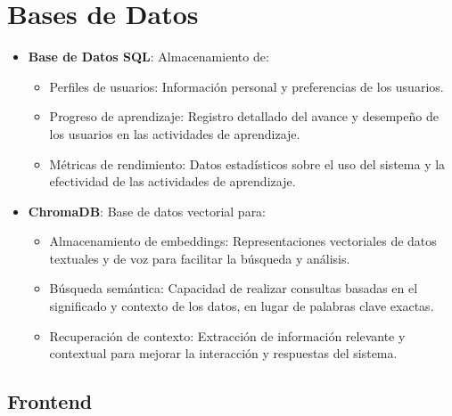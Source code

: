 \section{Bases de Datos}

\begin{itemize}
    \item \textbf{Base de Datos SQL}: Almacenamiento de:
    \begin{itemize}
        \item Perfiles de usuarios: Información personal y preferencias de los usuarios.
        \item Progreso de aprendizaje: Registro detallado del avance y desempeño de los usuarios en las actividades de aprendizaje.
        \item Métricas de rendimiento: Datos estadísticos sobre el uso del sistema y la efectividad de las actividades de aprendizaje.
    \end{itemize}
    
    \item \textbf{ChromaDB}: Base de datos vectorial para:
    \begin{itemize}
        \item Almacenamiento de embeddings: Representaciones vectoriales de datos textuales y de voz para facilitar la búsqueda y análisis.
        \item Búsqueda semántica: Capacidad de realizar consultas basadas en el significado y contexto de los datos, en lugar de palabras clave exactas.
        \item Recuperación de contexto: Extracción de información relevante y contextual para mejorar la interacción y respuestas del sistema.
    \end{itemize}
\end{itemize}

\subsection{Frontend}

